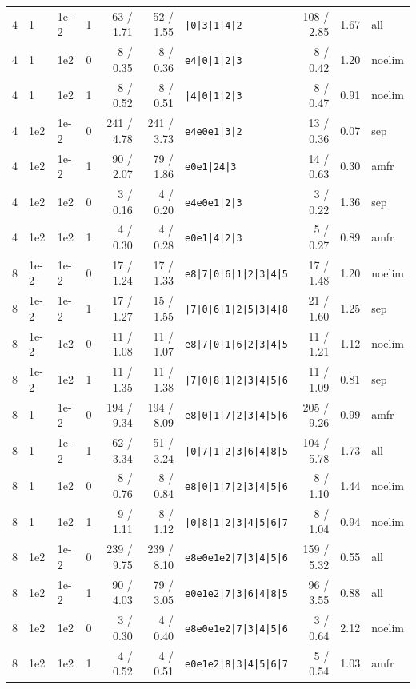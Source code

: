 \documentclass[11pt,a4paper]{ctexart}
\begin{document}
{\begin{longtable}{rlll rr l rr l}
4 & 1 & 1e-2 & 1 & 63 / 1.71 & 52 / 1.55 & \texttt{|0|3|1|4|2} & 108 / 2.85 & 1.67 & all \\
4 & 1 & 1e2 & 0 & 8 / 0.35 & 8 / 0.36 & \texttt{e4|0|1|2|3} & 8 / 0.42 & 1.20 & noelim \\
4 & 1 & 1e2 & 1 & 8 / 0.52 & 8 / 0.51 & \texttt{|4|0|1|2|3} & 8 / 0.47 & 0.91 & noelim \\
4 & 1e2 & 1e-2 & 0 & 241 / 4.78 & 241 / 3.73 & \texttt{e4e0e1|3|2} & 13 / 0.36 & 0.07 & sep \\
4 & 1e2 & 1e-2 & 1 & 90 / 2.07 & 79 / 1.86 & \texttt{e0e1|24|3} & 14 / 0.63 & 0.30 & amfr \\
4 & 1e2 & 1e2 & 0 & 3 / 0.16 & 4 / 0.20 & \texttt{e4e0e1|2|3} & 3 / 0.22 & 1.36 & sep \\
4 & 1e2 & 1e2 & 1 & 4 / 0.30 & 4 / 0.28 & \texttt{e0e1|4|2|3} & 5 / 0.27 & 0.89 & amfr \\
8 & 1e-2 & 1e-2 & 0 & 17 / 1.24 & 17 / 1.33 & \texttt{e8|7|0|6|1|2|3|4|5} & 17 / 1.48 & 1.20 & noelim \\
8 & 1e-2 & 1e-2 & 1 & 17 / 1.27 & 15 / 1.55 & \texttt{|7|0|6|1|2|5|3|4|8} & 21 / 1.60 & 1.25 & sep \\
8 & 1e-2 & 1e2 & 0 & 11 / 1.08 & 11 / 1.07 & \texttt{e8|7|0|1|6|2|3|4|5} & 11 / 1.21 & 1.12 & noelim \\
8 & 1e-2 & 1e2 & 1 & 11 / 1.35 & 11 / 1.38 & \texttt{|7|0|8|1|2|3|4|5|6} & 11 / 1.09 & 0.81 & sep \\
8 & 1 & 1e-2 & 0 & 194 / 9.34 & 194 / 8.09 & \texttt{e8|0|1|7|2|3|4|5|6} & 205 / 9.26 & 0.99 & amfr \\
8 & 1 & 1e-2 & 1 & 62 / 3.34 & 51 / 3.24 & \texttt{|0|7|1|2|3|6|4|8|5} & 104 / 5.78 & 1.73 & all \\
8 & 1 & 1e2 & 0 & 8 / 0.76 & 8 / 0.84 & \texttt{e8|0|1|7|2|3|4|5|6} & 8 / 1.10 & 1.44 & noelim \\
8 & 1 & 1e2 & 1 & 9 / 1.11 & 8 / 1.12 & \texttt{|0|8|1|2|3|4|5|6|7} & 8 / 1.04 & 0.94 & noelim \\
8 & 1e2 & 1e-2 & 0 & 239 / 9.75 & 239 / 8.10 & \texttt{e8e0e1e2|7|3|4|5|6} & 159 / 5.32 & 0.55 & all \\
8 & 1e2 & 1e-2 & 1 & 90 / 4.03 & 79 / 3.05 & \texttt{e0e1e2|7|3|6|4|8|5} & 96 / 3.55 & 0.88 & all \\
8 & 1e2 & 1e2 & 0 & 3 / 0.30 & 4 / 0.40 & \texttt{e8e0e1e2|7|3|4|5|6} & 3 / 0.64 & 2.12 & noelim \\
8 & 1e2 & 1e2 & 1 & 4 / 0.52 & 4 / 0.51 & \texttt{e0e1e2|8|3|4|5|6|7} & 5 / 0.54 & 1.03 & amfr \\
\bottomrule
\end{longtable}}
\end{document}
